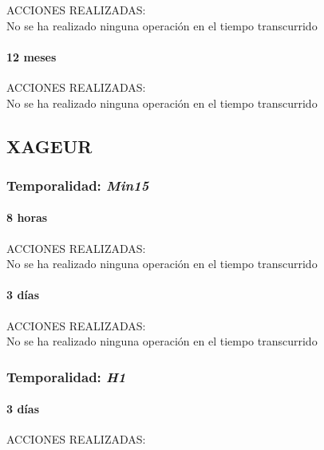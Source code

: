 ACCIONES REALIZADAS:\\

No se ha realizado ninguna operación en el tiempo transcurrido

\paragraph{12 meses}

ACCIONES REALIZADAS:\\

No se ha realizado ninguna operación en el tiempo transcurrido






\subsection{XAGEUR}

\subsubsection{Temporalidad: \textit{Min15}}

\paragraph{8 horas}

ACCIONES REALIZADAS:\\

No se ha realizado ninguna operación en el tiempo transcurrido

\paragraph{3 días}

ACCIONES REALIZADAS:\\

No se ha realizado ninguna operación en el tiempo transcurrido

\subsubsection{Temporalidad: \textit{H1}}

\paragraph{3 días}

ACCIONES REALIZADAS:\\

